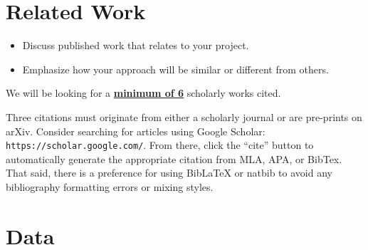 \documentclass[conference]{IEEEtran}
\begin{document}
\section{Related Work}

\begin{itemize}
  \item Discuss published work that relates to your project.
  \item Emphasize how your approach will be similar or different from others.
\end{itemize}

We will be looking for a \textbf{\underline{minimum of 6}} scholarly works cited.

Three citations must originate from either a scholarly journal or are pre-prints on arXiv. Consider searching for articles using Google Scholar: \texttt{https://scholar.google.com/}. From there, click the “cite” button to automatically generate the appropriate citation from MLA, APA, or BibTex. That said, there is a preference for using BibLaTeX or natbib to avoid any bibliography formatting errors or mixing styles.

\section{Data}
\end{document}
